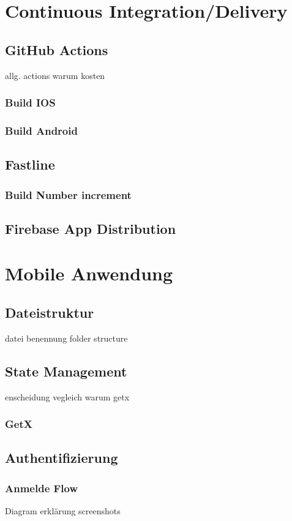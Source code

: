\section{Continuous Integration/Delivery}
\subsection{GitHub Actions}
allg. actions warum kosten
\subsubsection{Build IOS}
\subsubsection{Build Android}

\subsection{Fastline}
\subsubsection{Build Number increment}
\subsection{Firebase App Distribution}

\section{Mobile Anwendung}
\subsection{Dateistruktur}
datei benennung folder structure
\subsection{State Management}
enscheidung vegleich warum getx
\subsubsection{GetX}

\subsection{Authentifizierung}
\subsubsection{Anmelde Flow}
Diagram
erklärung
screenshots
